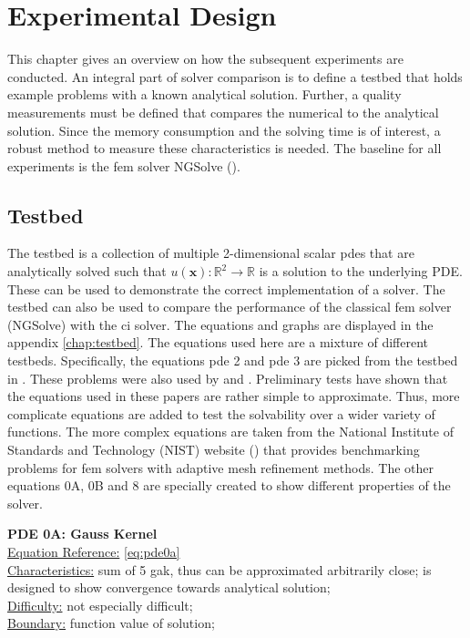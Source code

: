 \documentclass[./\jobname.tex]{subfiles}
\begin{document}
\chapter{Experimental Design}
This chapter gives an overview on how the subsequent experiments are conducted. An integral part of solver comparison is to define a testbed that holds example problems with a known analytical solution. Further, a quality measurements must be defined that compares the numerical to the analytical solution. Since the memory consumption and the solving time is of interest, a robust method to measure these characteristics is needed. The baseline for all experiments is the \gls{fem} solver NGSolve (\cite{mitchell_nist_2018}). 

\section{Testbed}
The testbed is a collection of multiple 2-dimensional scalar \gls{pde}s that are analytically solved such that $u(\mathbf{x}): \mathbb{R}^2 \rightarrow \mathbb{R}$ is a solution to the underlying PDE. These can be used to demonstrate the correct implementation of a solver. The testbed can also be used to compare the performance of the classical \gls{fem} solver (NGSolve) with the \gls{ci} solver. The equations and graphs are displayed in the appendix \ref{chap:testbed}. The equations used here are a mixture of different testbeds. Specifically, the equations \gls{pde} 2 and \gls{pde} 3 are picked from the testbed in \cite{chaquet_using_2019}. These problems were also used by \cite{tsoulos_solving_2006} and \cite{panagant_solving_2014}. Preliminary tests have shown that the equations used in these papers are rather simple to approximate. Thus, more complicate equations are added to test the solvability over a wider variety of functions. The more complex equations are taken from the National Institute of Standards and Technology (NIST) website (\cite{mitchell_nist_2018}) that provides benchmarking problems for \gls{fem} solvers with adaptive mesh refinement methods. The other equations 0A, 0B and 8 are specially created to show different properties of the solver. 

\textbf{PDE 0A: Gauss Kernel} \\
\underline{Equation Reference:} \eqref{eq:pde0a} \\
\underline{Characteristics:} sum of 5 \gls{gak}, thus can be approximated arbitrarily close; is designed to show convergence towards analytical solution; \\
\underline{Difficulty:} not especially difficult; \\
\underline{Boundary:} function value of solution; \\
\end{document}

